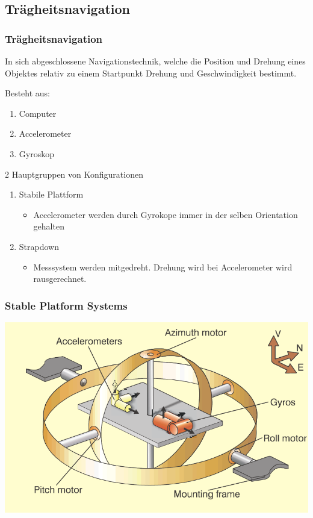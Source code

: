 \documentclass[10pt,a4paper,oneside]{beamer}
\begin{document}
\begin{frame}
	\section{Trägheitsnavigation}
	\frametitle{Trägheitsnavigation}
	In sich abgeschlossene Navigationstechnik, 
	welche die Position und Drehung eines Objektes relativ zu einem Startpunkt Drehung und Geschwindigkeit bestimmt.
	
	Besteht aus:
	\begin{enumerate}
		\item Computer
		\item Accelerometer
		\item Gyroskop
	\end{enumerate}
	
	2 Hauptgruppen von Konfigurationen \cite{Wood07}
	\begin{enumerate}
		\item Stabile Plattform
			\begin{itemize}
				\item Accelerometer werden durch Gyrokope immer in der selben Orientation gehalten
			\end{itemize}
		\item Strapdown
			\begin{itemize}
				\item Messsystem werden mitgedreht. Drehung wird bei Accelerometer wird rausgerechnet.
			\end{itemize}
	\end{enumerate}
\end{frame}

\begin{frame}
	\frametitle{Stable Platform Systems}
	\includegraphics[scale=0.55]{images/gimbal.png} \cite{King98}
\end{frame}
\end{document}
